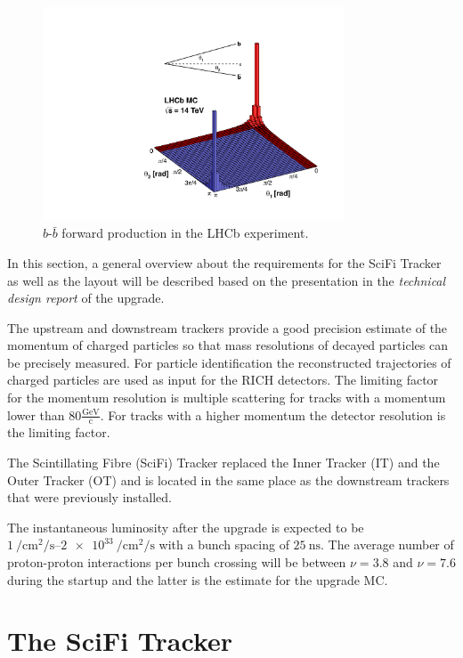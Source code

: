 \begin{figure}
  \centering
  \includegraphics[width=0.8\textwidth]{plots/lhcb_forward.pdf}
  \caption{$b$-$\bar{b}$ forward production in the LHCb experiment\cite{bbangles}.}
  \label{fig:bbforward}
\end{figure}

In this section, a general overview about the requirements for the SciFi Tracker as well as the layout will be described based on the presentation in the \textit{technical design report}\cite{scifiInfo} of the upgrade.

The upstream and downstream trackers provide a good precision estimate of the momentum of charged particles so that mass resolutions of decayed particles can be precisely measured.
For particle identification the reconstructed trajectories of charged particles are used as input for the RICH detectors.
The limiting factor for the momentum resolution is multiple scattering for tracks with a momentum lower than $\num{80}\frac{\text{GeV}}{\text{c}}$. For tracks with a higher momentum the detector resolution is the limiting factor.

The Scintillating Fibre (SciFi) Tracker replaced the Inner Tracker (IT) and the Outer Tracker (OT)
and is located in the same place as the downstream trackers that were previously installed.

The instantaneous luminosity after the upgrade is expected to be $\SIrange{1}{2e33}{\per\centi\metre\squared\per\second}$ with a bunch spacing of $\SI{25}{\nano\second}$.
The average number of proton-proton interactions per bunch crossing will be between
$\nu = 3.8$ and $\nu = 7.6$ during the startup and the latter is the estimate for the upgrade MC.

\section{The SciFi Tracker}
\label{sec:scitracker}
